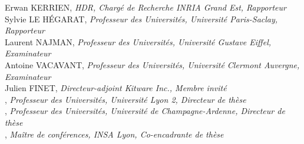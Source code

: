 \begin{titlepage}
	\hspace*{15pt}
	\begin{minipage}[t]{\textwidth}
		{\small Erwan KERRIEN, \textit{HDR, Chargé de Recherche INRIA Grand Est, Rapporteur}} \\
		{\small Sylvie LE HÉGARAT, \textit{Professeur des Universités, Université Paris-Saclay, Rapporteur}} \\
		{\small Laurent NAJMAN, \textit{Professeur des Universités, Université Gustave Eiffel, Examinateur}} \\
		{\small Antoine VACAVANT, \textit{Professeur des Universités, Université Clermont Auvergne, Examinateur}} \\
        {\small Julien FINET, \textit{Directeur-adjoint Kitware Inc., Membre invité}} \\
		{\small \thesisFirstSupervisor, \textit{Professeur des Universités, Université Lyon 2, Directeur de thèse}} \\
	  	{\small \thesisSecondSupervisor, \textit{Professeur des Universités, Université de Champagne-Ardenne, Directeur de thèse}} \\
		{\small \thesisThirdSupervisor, \textit{Maître de conférences, INSA Lyon, Co-encadrante de thèse}}
	\end{minipage} \\[5mm]


	\thesisDate \\

\end{titlepage}


